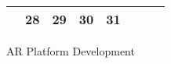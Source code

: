 {\begin{tabularx}{\linewidth}{|l!{\vrule width \myLenLineThicknessThick}*{7}{@{}X@{}|}}
       & 
    
      
      
        \begin{minipage}[t]{6mm}\centering{}28\end{minipage}
      
       & 
    
      
      
        \begin{minipage}[t]{6mm}\centering{}29\end{minipage}
      
       & 
    
      
      
        \begin{minipage}[t]{6mm}\centering{}30\end{minipage}
      
       & 
    
      
      
        \begin{minipage}[t]{6mm}\centering{}31\end{minipage}
      
       & 
    
      
      
       & 
    
      
      
      
        \\  \hline 
      
    
  
  
  \end{tabularx}
}
\vfill{\centering{} \small{AR Platform Development}\hspace{ 1.5em }\par}

\pagebreak
